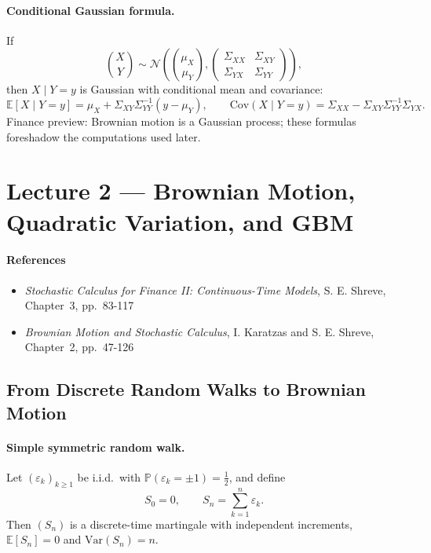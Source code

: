 \documentclass[11pt]{article}
\newcommand{\Pbb}{\mathbb{P}}
\newcommand{\E}{\mathbb{E}}
\newcommand{\Var}{\mathrm{Var}}
\newcommand{\Cov}{\mathrm{Cov}}
\newcommand{\1}{\mathbf{1}}
\theoremstyle{plain}
\theoremstyle{definition}
\theoremstyle{remark}
\begin{document}
\paragraph{Conditional Gaussian formula.}
If
\[
\binom{X}{Y}\sim \mathcal N\!\left(
\binom{\mu_X}{\mu_Y},
\begin{pmatrix}
\Sigma_{XX} & \Sigma_{XY}\\
\Sigma_{YX} & \Sigma_{YY}
\end{pmatrix}
\right),
\]
then $X\mid Y=y$ is Gaussian with conditional mean and covariance:
\[
\E[X\mid Y=y]=\mu_X+\Sigma_{XY}\Sigma_{YY}^{-1}(y-\mu_Y),
\qquad
\Cov(X\mid Y=y)=\Sigma_{XX}-\Sigma_{XY}\Sigma_{YY}^{-1}\Sigma_{YX}.
\]
Finance preview: Brownian motion is a Gaussian process; these formulas foreshadow the computations used later.


\section{Lecture 2 --- Brownian Motion, Quadratic Variation, and GBM}

\paragraph{References}

\begin{itemize}[leftmargin=1.4em]

\item \textit{Stochastic Calculus for Finance II: Continuous-Time Models}, S. E. Shreve, Chapter~3, pp.~83-117

\item \textit{Brownian Motion and Stochastic Calculus}, I. Karatzas and S. E. Shreve, Chapter~2, pp.~47-126

\end{itemize}


\subsection{From Discrete Random Walks to Brownian Motion}

\paragraph{Simple symmetric random walk.}
Let $(\varepsilon_k)_{k\ge1}$ be i.i.d.\ with
$\Pbb(\varepsilon_k=\pm1)=\tfrac12$, and define
\[
S_0=0,
\qquad
S_n=\sum_{k=1}^n \varepsilon_k .
\]
Then $(S_n)$ is a discrete-time martingale with independent increments,
$\E[S_n]=0$ and $\Var(S_n)=n$.
\end{document}
